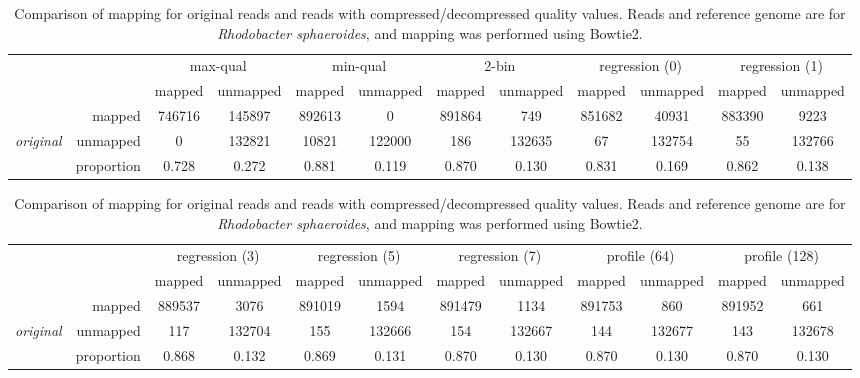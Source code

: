 \documentclass{bioinfo}
\begin{document}
\begin{table}[!tbhp]
\centering
\caption[]{Comparison of mapping for original reads and reads with
  compressed/decompressed quality values. Reads and reference genome
  are for \textit{Rhodobacter sphaeroides}, and mapping was performed
  using Bowtie2.}
\begin{small}
\begin{tabular}{lr|cc|cc|cc|cc|cc}
 & & \multicolumn{2}{c|}{max-qual} & \multicolumn{2}{c|}{min-qual} & \multicolumn{2}{c|}{2-bin} & \multicolumn{2}{c|}{regression (0)} & \multicolumn{2}{c}{regression (1)} \\
& & mapped & unmapped & mapped & unmapped & mapped & unmapped & mapped & unmapped & mapped & unmapped \\ 
\cline{2-12}
& mapped & 746716 & 145897 & 892613 &   0 & 891864 & 749 & 851682 & 40931 & 883390 & 9223 \\ 
{\em original} & unmapped &   0 & 132821 & 10821 & 122000 & 186 & 132635 &  67 & 132754 &  55 & 132766 \\ 
\cline{2-12}
& proportion & 0.728 & 0.272 & 0.881 & 0.119 & 0.870 & 0.130 & 0.831 & 0.169 & 0.862 & 0.138 \\ 
\end{tabular}

\bigskip

\begin{tabular}{lr|cc|cc|cc|cc|cc}
 & & \multicolumn{2}{c|}{regression (3)} & \multicolumn{2}{c|}{regression (5)} & \multicolumn{2}{c|}{regression (7)} & \multicolumn{2}{c|}{profile (64)} & \multicolumn{2}{c}{profile (128)} \\
& & mapped & unmapped & mapped & unmapped & mapped & unmapped & mapped & unmapped & mapped & unmapped \\ 
\cline{2-12}
& mapped & 889537 & 3076 & 891019 & 1594 & 891479 & 1134 & 891753 & 860 & 891952 & 661 \\ 
{\em original} & unmapped & 117 & 132704 & 155 & 132666 & 154 & 132667 & 144 & 132677 & 143 & 132678 \\ 
\cline{2-12}
& proportion & 0.868 & 0.132 & 0.869 & 0.131 & 0.870 & 0.130 & 0.870 & 0.130 & 0.870 & 0.130 \\ 
\end{tabular}


\end{small}
\end{table}
\end{document}
